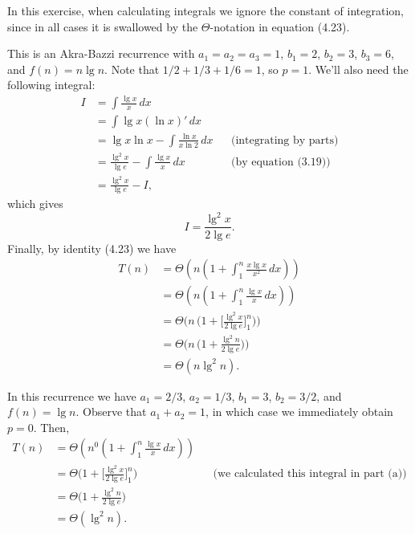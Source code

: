 In this exercise, when calculating integrals we ignore the constant of integration, since in all cases it is swallowed by the $\Theta$-notation in equation (4.23).
\vspace*{2\baselineskip}

\subexercise
This is an Akra-Bazzi recurrence with $a_1=a_2=a_3=1$, $b_1=2$, $b_2=3$, $b_3=6$, and $f(n)=n\lg n$.
Note that $1/2+1/3+1/6=1$, so $p=1$.
We'll also need the following integral:
\begin{align*}
    I &= \int\frac{\lg x}{x}\,dx \\
    &= \int\lg x(\ln x)'\,dx \\
    &= \lg x\ln x-\int\frac{\ln x}{x\ln2}\,dx && \text{(integrating by parts)} \\
    &= \frac{\lg^2x}{\lg e}-\int\frac{\lg x}{x}\,dx && \text{(by equation (3.19))} \\[1mm]
    &= \frac{\lg^2x}{\lg e}-I,
\end{align*}
which gives
\[
    I = \frac{\lg^2x}{2\lg e}.
\]
Finally, by identity (4.23) we have
\begin{align*}
    T(n) &= \Theta\left(n\left(1+\int_1^n\frac{x\lg x}{x^2}\,dx\right)\right) \\
    &= \Theta\left(n\left(1+\int_1^n\frac{\lg x}{x}\,dx\right)\right) \\
    &= \Theta\biggl(n\,\biggl(1+\biggl[\frac{\lg^2x}{2\lg e}\biggr]_1^n\biggr)\biggr) \\
    &= \Theta\biggl(n\,\biggl(1+\frac{\lg^2n}{2\lg e}\biggr)\biggr) \\
    &= \Theta(n\lg^2n).
\end{align*}

\subexercise
\workinprogress %

\subexercise
In this recurrence we have $a_1=2/3$, $a_2=1/3$, $b_1=3$, $b_2=3/2$, and $f(n)=\lg n$.
Observe that $a_1+a_2=1$, in which case we immediately obtain $p=0$.
Then,
\begin{align*}
    T(n) &= \Theta\left(n^0\left(1+\int_1^n\frac{\lg x}{x}\,dx\right)\right) \\
    &= \Theta\biggl(1+\biggl[\frac{\lg^2x}{2\lg e}\biggr]_1^n\biggr) && \text{(we calculated this integral in part (a))} \\
    &= \Theta\biggl(1+\frac{\lg^2n}{2\lg e}\biggr) \\
    &= \Theta(\lg^2n).
\end{align*}

